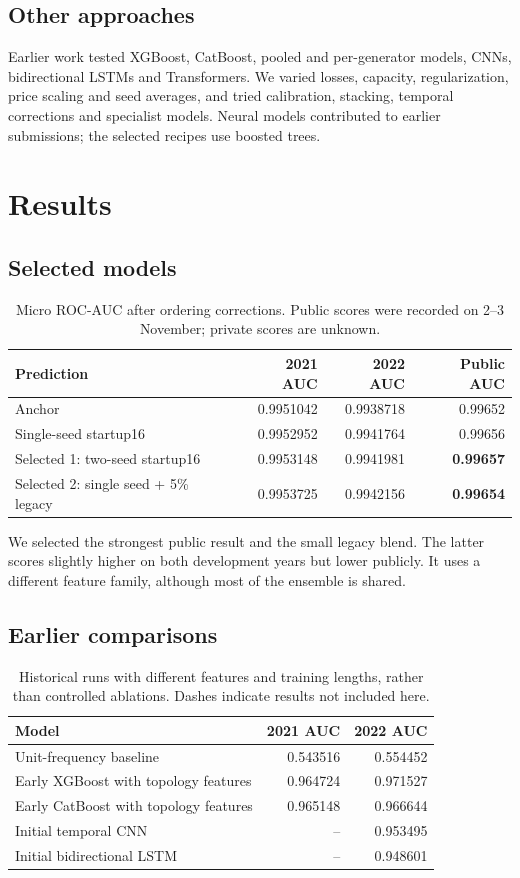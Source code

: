 \documentclass[a4paper,11pt]{article}
\begin{document}
\subsection*{Other approaches}
Earlier work tested XGBoost, CatBoost, pooled and per-generator models, CNNs, bidirectional LSTMs and Transformers. We varied losses, capacity, regularization, price scaling and seed averages, and tried calibration, stacking, temporal corrections and specialist models. Neural models contributed to earlier submissions; the selected recipes use boosted trees.

\section{Results}
\subsection*{Selected models}
\begin{table}[ht]
\centering
\begin{tabular}{lrrr}
\hline
Prediction & 2021 AUC & 2022 AUC & Public AUC\\\hline
Anchor & 0.9951042 & 0.9938718 & 0.99652\\
Single-seed startup16 & 0.9952952 & 0.9941764 & 0.99656\\
Selected 1: two-seed startup16 & 0.9953148 & 0.9941981 & \textbf{0.99657}\\
Selected 2: single seed + 5\% legacy & 0.9953725 & 0.9942156 & \textbf{0.99654}\\\hline
\end{tabular}
\caption{Micro ROC-AUC after ordering corrections. Public scores were recorded on 2--3 November; private scores are unknown.}\label{results}
\end{table}

We selected the strongest public result and the small legacy blend. The latter scores slightly higher on both development years but lower publicly. It uses a different feature family, although most of the ensemble is shared.

\subsection*{Earlier comparisons}
\begin{table}[ht]
\centering
\begin{tabular}{lrr}
\hline
Model & 2021 AUC & 2022 AUC\\\hline
Unit-frequency baseline & 0.543516 & 0.554452\\
Early XGBoost with topology features & 0.964724 & 0.971527\\
Early CatBoost with topology features & 0.965148 & 0.966644\\
Initial temporal CNN & -- & 0.953495\\
Initial bidirectional LSTM & -- & 0.948601\\\hline
\end{tabular}
\caption{Historical runs with different features and training lengths, rather than controlled ablations. Dashes indicate results not included here.}
\end{table}
\end{document}
